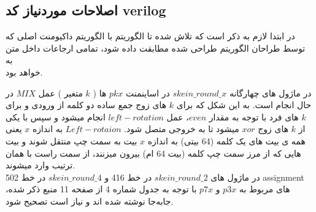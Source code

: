 \subsection{اصلاحات موردنیاز کد verilog}
در ابتدا لازم به ذکر است که تلاش شده تا الگوریتم با الگوریتم داکیومنت اصلی که توسط طراحان الگوریتم طراحی شده مطابقت داده شود، تمامی ارجاعات داخل متن به \\
	خواهد بود. 
\par
در ماژول های چهارگانه $skein\_round\_x$ در اساینمنت $pkx$ ها 
( $k$ متغیر )
عمل $MIX$ در حال انجام است. به این شکل که برای $k$ های زوج جمع ساده دو کلمه از ورودی و برای $k$ های فرد با توجه به مقدار $even$، عمل $left-rotation$ انجام میشود و سپس با یکی از $k$ های زوج $xor$ میشود تا به خروجی متصل شود.
$Left-rotaion$ به اندازه $x$ یعنی همه ی بیت های یک کلمه (64 بیتی) به اندازه $x$ بیت به سمت چپ منتقل شوند و بیت هایی که از مرز سمت چپ کلمه (بیت 64 ام) بیرون میزنند، از سمت راست با همان ترتیب وارد میشوند.\\
 در ماژول های $skein\_round\_2$ در خط 416 و $skein\_round\_4$ در خط 502 assignment های مربوط به $p3x$ و $p7x$ با توجه به جدول شماره 4 از صفحه 11 منبع ذکر شده، جابه‌جا نوشته شده اند و نیاز است تصحیح شود.\\
  \pagebreak

